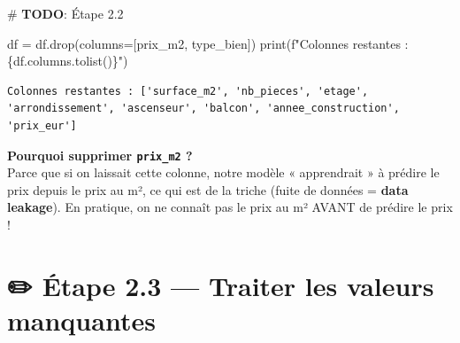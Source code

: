 \documentclass[
  french,
  11pt,
  a4paper,
]{scrbook}
\newenvironment{Shaded}{}{}
\newcommand{\AlertTok}[1]{\textcolor[rgb]{1.00,0.33,0.33}{\textbf{#1}}}
\newcommand{\BuiltInTok}[1]{\textcolor[rgb]{0.84,0.23,0.29}{#1}}
\newcommand{\CommentTok}[1]{\textcolor[rgb]{0.42,0.45,0.49}{#1}}
\newcommand{\NormalTok}[1]{\textcolor[rgb]{0.14,0.16,0.18}{#1}}
\newcommand{\OperatorTok}[1]{\textcolor[rgb]{0.14,0.16,0.18}{#1}}
\newcommand{\SpecialCharTok}[1]{\textcolor[rgb]{0.00,0.36,0.77}{#1}}
\newcommand{\SpecialStringTok}[1]{\textcolor[rgb]{0.01,0.18,0.38}{#1}}
\newcommand{\StringTok}[1]{\textcolor[rgb]{0.01,0.18,0.38}{#1}}
\begin{document}
\begin{Shaded}
\begin{Highlighting}[]
\CommentTok{\# }\AlertTok{TODO}\CommentTok{: Étape 2.2}
\end{Highlighting}
\end{Shaded}

\begin{tcolorbox}[enhanced jigsaw, arc=.35mm, bottomrule=.15mm, bottomtitle=1mm, breakable, colback=white, colbacktitle=quarto-callout-tip-color!10!white, colframe=quarto-callout-tip-color-frame, coltitle=black, left=2mm, leftrule=.75mm, opacityback=0, opacitybacktitle=0.6, rightrule=.15mm, title=\textcolor{quarto-callout-tip-color}{\faLightbulb}\hspace{0.5em}{✅ Corrigé Étape 2.2}, titlerule=0mm, toprule=.15mm, toptitle=1mm]

\begin{Shaded}
\begin{Highlighting}[]
\NormalTok{df }\OperatorTok{=}\NormalTok{ df.drop(columns}\OperatorTok{=}\NormalTok{[}\StringTok{\textquotesingle{}prix\_m2\textquotesingle{}}\NormalTok{, }\StringTok{\textquotesingle{}type\_bien\textquotesingle{}}\NormalTok{])}
\BuiltInTok{print}\NormalTok{(}\SpecialStringTok{f"Colonnes restantes : }\SpecialCharTok{\{}\NormalTok{df}\SpecialCharTok{.}\NormalTok{columns}\SpecialCharTok{.}\NormalTok{tolist()}\SpecialCharTok{\}}\SpecialStringTok{"}\NormalTok{)}
\end{Highlighting}
\end{Shaded}

\begin{verbatim}
Colonnes restantes : ['surface_m2', 'nb_pieces', 'etage', 'arrondissement', 'ascenseur', 'balcon', 'annee_construction', 'prix_eur']
\end{verbatim}

\textbf{Pourquoi supprimer \texttt{prix\_m2} ?}\\
Parce que si on laissait cette colonne, notre modèle « apprendrait » à
prédire le prix depuis le prix au m², ce qui est de la triche (fuite de
données = \textbf{data leakage}). En pratique, on ne connaît pas le prix
au m² AVANT de prédire le prix !

\end{tcolorbox}

\section{✏️ Étape 2.3 --- Traiter les valeurs
manquantes}\label{uxe9tape-2.3-traiter-les-valeurs-manquantes}
\end{document}
